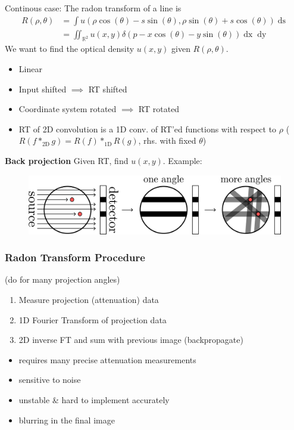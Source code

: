 \documentclass[a4paper,10pt]{article}
\newcommand*\bad{\item[\textcolor{badred}{\(\bm{-}\)}]}
\begin{document}
Continous case: The radon transform of a line is 
\begin{align*}
    R(\rho , \theta) &= \int u(\rho \cos (\theta ) - s \sin (\theta ), \rho \sin (\theta ) + s \cos (\theta )) \mathop{ds} \\&= \iint_{\mathbb{R}^2} u(x,y) \delta (p - x \cos (\theta) - y \sin (\theta) ) \mathop{dx} \mathop{dy}
\end{align*}
We want to find the optical density \( u(x,y) \) given \( R(\rho , \theta ) \).

\begin{itemize}
    \item Linear
    \item Input shifted \( \implies \) RT shifted
    \item Coordinate system rotated \( \implies \) RT rotated
    \item RT of 2D convolution is a 1D conv. of RT'ed functions with respect to \( \rho \) (\( R(f*_\text{2D} g) = R(f) *_\text{1D} R(g) \), rhs. with fixed \( \theta  \))
\end{itemize}
\textbf{Back projection} Given RT, find \( u(x,y) \). Example:
\begin{figure}[h]
    \includegraphics[width=\linewidth]{radon-back-projection.png}
\end{figure}

\subsubsection{Radon Transform Procedure} (do for many projection angles)
\begin{enumerate}
    \item Measure projection (attenuation) data
    \item 1D Fourier Transform of projection data
    \item 2D inverse FT and sum with previous image (backpropagate)
\end{enumerate}
\begin{itemize}
    \bad requires many precise attenuation measurements
    \bad sensitive to noise
    \bad unstable \& hard to implement accurately
    \bad blurring in the final image
\end{itemize}
\end{document}
